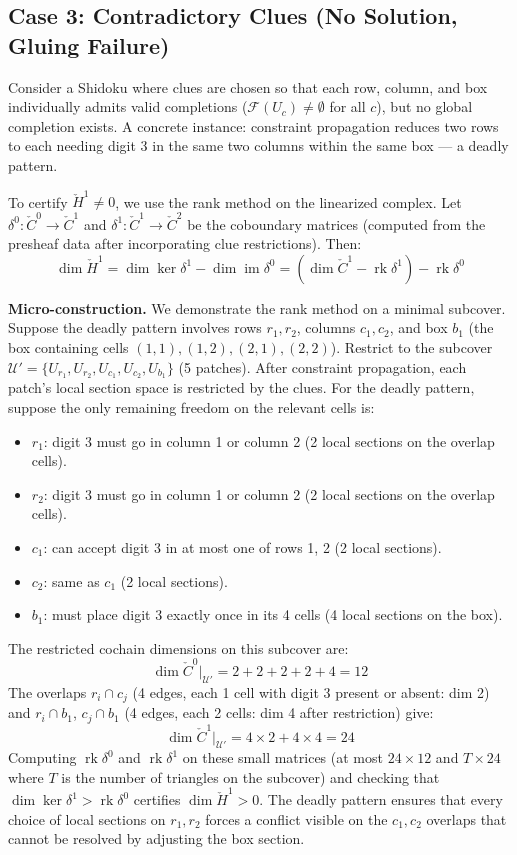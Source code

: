 \documentclass[11pt,letterpaper]{article}
\newcommand{\Cech}{\check{C}}
\newcommand{\Hcech}{\check{H}}
\newcommand{\sheaf}{\mathcal{F}}
\newcommand{\cover}{\mathcal{U}}
\DeclareMathOperator{\im}{im}
\DeclareMathOperator{\rk}{rk}
\begin{document}
\subsection{Case 3: Contradictory Clues (No Solution, Gluing Failure)}

Consider a Shidoku where clues are chosen so that each row, column, 
and box individually admits valid completions ($\sheaf(U_c) \neq 
\emptyset$ for all $c$), but no global completion exists. A concrete 
instance: constraint propagation reduces two rows to each needing 
digit 3 in the same two columns within the same box --- a deadly 
pattern.

To certify $\Hcech^1 \neq 0$, we use the rank method on the 
linearized complex. Let $\delta^0 : \Cech^0 \to \Cech^1$ and 
$\delta^1 : \Cech^1 \to \Cech^2$ be the coboundary matrices 
(computed from the presheaf data after incorporating clue 
restrictions). Then:
\begin{equation}\label{eq:h1_rank}
    \dim \Hcech^1 = \dim \ker \delta^1 - \dim \im \delta^0 
    = (\dim \Cech^1 - \rk \delta^1) - \rk \delta^0
\end{equation}

\textbf{Micro-construction.} We demonstrate the rank method on 
a minimal subcover. Suppose the deadly pattern involves rows 
$r_1, r_2$, columns $c_1, c_2$, and box $b_1$ (the box containing 
cells $(1,1), (1,2), (2,1), (2,2)$). Restrict to the subcover 
$\cover' = \{U_{r_1}, U_{r_2}, U_{c_1}, U_{c_2}, U_{b_1}\}$ 
(5 patches). After constraint propagation, each patch's local 
section space is restricted by the clues. For the deadly pattern, 
suppose the only remaining freedom on the relevant cells is:

\begin{itemize}
    \item $r_1$: digit 3 must go in column 1 or column 2 
    (2 local sections on the overlap cells).
    \item $r_2$: digit 3 must go in column 1 or column 2 
    (2 local sections on the overlap cells).
    \item $c_1$: can accept digit 3 in at most one of rows 1, 2 
    (2 local sections).
    \item $c_2$: same as $c_1$ (2 local sections).
    \item $b_1$: must place digit 3 exactly once in its 4 cells 
    (4 local sections on the box).
\end{itemize}

The restricted cochain dimensions on this subcover are:
\[
    \dim \Cech^0|_{\cover'} = 2 + 2 + 2 + 2 + 4 = 12
\]
The overlaps $r_i \cap c_j$ (4 edges, each 1 cell with digit 3 
present or absent: dim 2) and $r_i \cap b_1$, $c_j \cap b_1$ 
(4 edges, each 2 cells: dim 4 after restriction) give:
\[
    \dim \Cech^1|_{\cover'} = 4 \times 2 + 4 \times 4 = 24
\]
Computing $\rk \delta^0$ and $\rk \delta^1$ on these small matrices 
(at most $24 \times 12$ and $T \times 24$ where $T$ is the number 
of triangles on the subcover) and checking that 
$\dim \ker \delta^1 > \rk \delta^0$ certifies $\dim \Hcech^1 > 0$. 
The deadly pattern ensures that every choice of local sections on 
$r_1, r_2$ forces a conflict visible on the $c_1, c_2$ overlaps 
that cannot be resolved by adjusting the box section.
\end{document}
